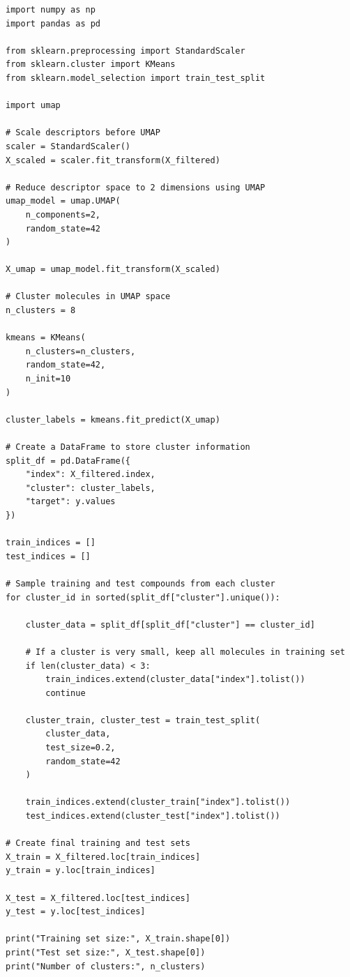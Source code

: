 \documentclass[11pt]{report}
\newenvironment{Important note}{\begin{quote}\color{red}\textbf{Important note:} }{\end{quote}}
\begin{document}
\begin{lstlisting}[style=pythonstyle, caption={UMAP-based cluster split.}]
import numpy as np
import pandas as pd

from sklearn.preprocessing import StandardScaler
from sklearn.cluster import KMeans
from sklearn.model_selection import train_test_split

import umap

# Scale descriptors before UMAP
scaler = StandardScaler()
X_scaled = scaler.fit_transform(X_filtered)

# Reduce descriptor space to 2 dimensions using UMAP
umap_model = umap.UMAP(
    n_components=2,
    random_state=42
)

X_umap = umap_model.fit_transform(X_scaled)

# Cluster molecules in UMAP space
n_clusters = 8

kmeans = KMeans(
    n_clusters=n_clusters,
    random_state=42,
    n_init=10
)

cluster_labels = kmeans.fit_predict(X_umap)

# Create a DataFrame to store cluster information
split_df = pd.DataFrame({
    "index": X_filtered.index,
    "cluster": cluster_labels,
    "target": y.values
})

train_indices = []
test_indices = []

# Sample training and test compounds from each cluster
for cluster_id in sorted(split_df["cluster"].unique()):

    cluster_data = split_df[split_df["cluster"] == cluster_id]

    # If a cluster is very small, keep all molecules in training set
    if len(cluster_data) < 3:
        train_indices.extend(cluster_data["index"].tolist())
        continue

    cluster_train, cluster_test = train_test_split(
        cluster_data,
        test_size=0.2,
        random_state=42
    )

    train_indices.extend(cluster_train["index"].tolist())
    test_indices.extend(cluster_test["index"].tolist())

# Create final training and test sets
X_train = X_filtered.loc[train_indices]
y_train = y.loc[train_indices]

X_test = X_filtered.loc[test_indices]
y_test = y.loc[test_indices]

print("Training set size:", X_train.shape[0])
print("Test set size:", X_test.shape[0])
print("Number of clusters:", n_clusters)
\end{lstlisting}
\end{document}
